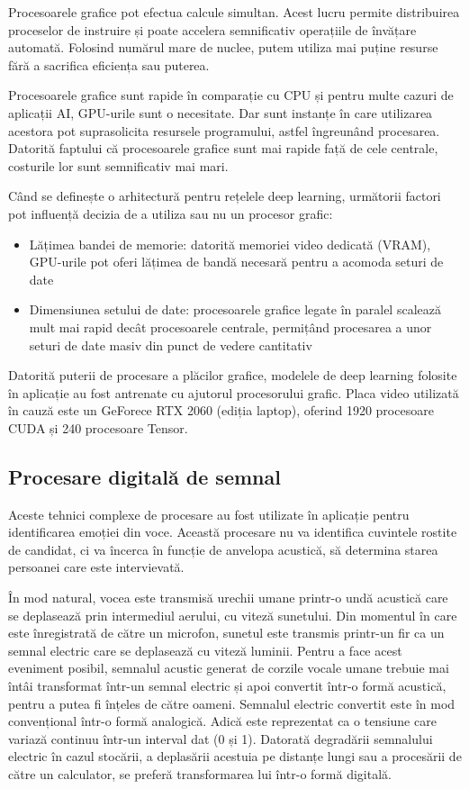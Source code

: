 \documentclass[a4paper, 12pt]{report}
\begin{document}
	Procesoarele grafice pot efectua calcule simultan. Acest lucru permite distribuirea proceselor de instruire și poate accelera semnificativ operațiile de învățare automată. Folosind numărul mare de nuclee, putem utiliza mai puține resurse fără a sacrifica eficiența sau puterea.
	
	Procesoarele grafice sunt rapide în comparație cu CPU și pentru multe cazuri de aplicații AI, GPU-urile sunt o necesitate. Dar sunt instanțe în care utilizarea acestora pot suprasolicita resursele programului, astfel îngreunând procesarea. Datorită faptului că procesoarele grafice sunt mai rapide față de cele centrale, costurile lor sunt semnificativ mai mari.
	
	Când se definește o arhitectură pentru rețelele deep learning, următorii factori pot influență decizia de a utiliza sau nu un procesor grafic:
	\begin{itemize}
		\item Lățimea bandei de memorie: datorită memoriei video dedicată (VRAM), GPU-urile pot oferi lățimea de bandă necesară pentru a acomoda seturi de date
		\item Dimensiunea setului de date: procesoarele grafice legate în paralel scalează mult mai rapid decât procesoarele centrale, permițând procesarea a unor seturi de date masiv din punct de vedere cantitativ
	\end{itemize}
	
	
	Datorită puterii de procesare a plăcilor grafice, modelele de deep learning folosite în aplicație au fost antrenate cu ajutorul procesorului grafic. Placa video utilizată în cauză este un GeForece RTX 2060 (ediția laptop), oferind 1920 procesoare CUDA și 240 procesoare Tensor.
	\clearpage

	\subsection{Procesare digitală de semnal}
	Aceste tehnici complexe de procesare au fost utilizate în aplicație pentru identificarea emoției din voce. Această procesare nu va identifica cuvintele rostite de candidat, ci va încerca în funcție de anvelopa acustică, să determina starea persoanei care este intervievată.

	În mod natural, vocea este transmisă urechii umane printr-o undă acustică care se deplasează prin intermediul aerului, cu viteză sunetului. Din momentul în care este înregistrată de către un microfon, sunetul este transmis printr-un fir ca un semnal electric care se deplasează cu viteză luminii. Pentru a face acest eveniment posibil, semnalul acustic generat de corzile vocale umane trebuie mai întâi transformat într-un semnal electric și apoi convertit într-o formă acustică, pentru a putea fi înțeles de către oameni. Semnalul electric convertit este în mod convențional într-o formă analogică. Adică este reprezentat ca o tensiune care variază continuu într-un interval dat (0 și 1). Datorată degradării semnalului electric în cazul stocării, a deplasării acestuia pe distanțe lungi sau a procesării de către un calculator, se preferă transformarea lui într-o formă digitală.
\end{document}
